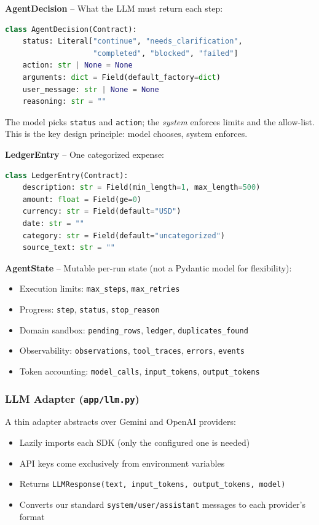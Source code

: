 \documentclass[12pt,a4paper]{article}
\begin{document}
\textbf{AgentDecision} -- What the LLM must return each step:
\begin{lstlisting}[language=Python]
class AgentDecision(Contract):
    status: Literal["continue", "needs_clarification",
                    "completed", "blocked", "failed"]
    action: str | None = None
    arguments: dict = Field(default_factory=dict)
    user_message: str | None = None
    reasoning: str = ""
\end{lstlisting}

The model picks \texttt{status} and \texttt{action}; the \emph{system} enforces limits and the allow-list. This is the key design principle: model chooses, system enforces.

\textbf{LedgerEntry} -- One categorized expense:
\begin{lstlisting}[language=Python]
class LedgerEntry(Contract):
    description: str = Field(min_length=1, max_length=500)
    amount: float = Field(ge=0)
    currency: str = Field(default="USD")
    date: str = ""
    category: str = Field(default="uncategorized")
    source_text: str = ""
\end{lstlisting}

\textbf{AgentState} -- Mutable per-run state (not a Pydantic model for flexibility):
\begin{itemize}
  \item Execution limits: \texttt{max\_steps}, \texttt{max\_retries}
  \item Progress: \texttt{step}, \texttt{status}, \texttt{stop\_reason}
  \item Domain sandbox: \texttt{pending\_rows}, \texttt{ledger}, \texttt{duplicates\_found}
  \item Observability: \texttt{observations}, \texttt{tool\_traces}, \texttt{errors}, \texttt{events}
  \item Token accounting: \texttt{model\_calls}, \texttt{input\_tokens}, \texttt{output\_tokens}
\end{itemize}

\subsubsection{LLM Adapter (\texttt{app/llm.py})}

A thin adapter abstracts over Gemini and OpenAI providers:
\begin{itemize}
  \item Lazily imports each SDK (only the configured one is needed)
  \item API keys come exclusively from environment variables
  \item Returns \texttt{LLMResponse(text, input\_tokens, output\_tokens, model)}
  \item Converts our standard \texttt{system/user/assistant} messages to each provider's format
\end{itemize}
\end{document}
